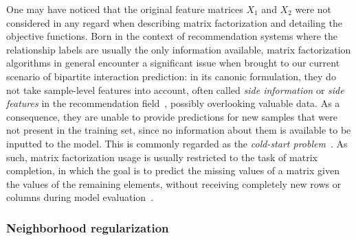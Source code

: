 % 

One may have noticed that the original feature matrices $X_1$ and $X_2$ were not considered in any regard when describing matrix factorization and detailing the objective functions.
Born in the context of recommendation systems where the relationship labels are usually the only information available, matrix factorization algorithms in general encounter a significant issue when brought to our current scenario of bipartite interaction prediction:
in its canonic formulation, they do not take sample-level features into account, often called \emph{side information} or \emph{side features} in the recommendation field~\cite{rafailidis2016modeling}, possibly overlooking valuable data. As a consequence, they are unable to provide predictions for new samples that were not present in the training set, since no information about them is available to be inputted to the model. This is commonly regarded as the \emph{cold-start problem}~\cite{lu2012recommender}. As such, matrix factorization usage is usually restricted to the task of matrix completion, in which the goal is to predict the missing values of a matrix given the values of the remaining elements, without receiving completely new rows or columns during model evaluation~\cite{lu2012recommender}.


\subsubsection{Neighborhood regularization}
\label{sec:neighborhood regularization}

